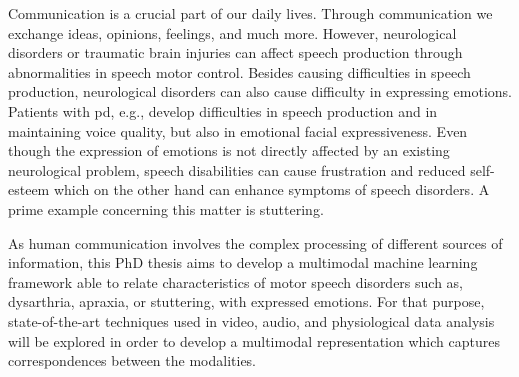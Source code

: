 

Communication is a crucial part of our daily lives. Through communication we exchange ideas, opinions, feelings, and much more.
However, neurological disorders or traumatic brain injuries can affect speech production through abnormalities in speech motor control.
Besides causing difficulties in speech production, neurological disorders can also cause difficulty in expressing emotions. Patients with
\gls{pd}, e.g., develop difficulties in speech production and in maintaining voice quality, but also in emotional facial
expressiveness.
Even though the expression of emotions is not directly affected by an existing neurological problem, speech disabilities can cause
frustration and reduced self-esteem which on the other hand can enhance symptoms of speech disorders. A prime example concerning this matter is \gls{stuttering}.

As human communication involves the complex processing of different sources of information, this PhD thesis aims to develop a multimodal machine learning framework able to relate characteristics of motor speech disorders such as, \gls{dysarthria}, \gls{apraxia}, or \gls{stuttering}, with expressed emotions. For that purpose, state-of-the-art techniques used in video, audio, and physiological data analysis will be explored in order to develop a multimodal representation which captures correspondences between the modalities. 

\begin{comment}
To understand the relationship between motor speech disorders and expressed emotions, the goal of this Phd thesis is to collect data of patients having Dysarthria, Apraxia of speech or Stuttering. As communication by itself is multimodal, the data will be collected using different modalities to gather video, audio and physiological data.
The data collected will be labeled by Speech Language Pathologists (SLPs) and analyzed using hand-crafted features. The data of the
different modalities will be analyzed separately using different types of classification (binary, multi-class, multi-label), as well as fused
together in order to evaluate if the different modalities bring more insights if they are joined in the feature space prior to classification.
\end{comment}

